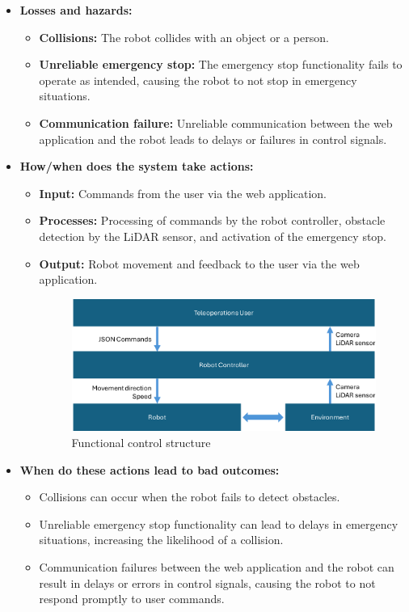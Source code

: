 \documentclass{article}
\begin{document}
\begin{itemize}[leftmargin=*]
    \item \textbf{Losses and hazards:}
    \begin{itemize}[label=--]
        \item \textbf{Collisions:} The robot collides with an object or a person.
        \item \textbf{Unreliable emergency stop:} The emergency stop functionality fails to operate as intended, causing the robot to not stop in emergency situations.
        \item \textbf{Communication failure:} Unreliable communication between the web application and the robot leads to delays or failures in control signals.
    \end{itemize}
    
    \item \textbf{How/when does the system take actions:}
    \begin{itemize}[label=--]
        \item \textbf{Input:} Commands from the user via the web application.
        \item \textbf{Processes:} Processing of commands by the robot controller, obstacle detection by the LiDAR sensor, and activation of the emergency stop.
        \item \textbf{Output:} Robot movement and feedback to the user via the web application.
        \begin{figure}[h]
            \centering
            \includegraphics[width=1\linewidth]{Functional_Control_Structure.png}
            \caption{Functional control structure}
            \label{fig:enter-label}
        \end{figure}
    \end{itemize}
    
    \item \textbf{When do these actions lead to bad outcomes:}
    \begin{itemize}[label=--]
        \item Collisions can occur when the robot fails to detect obstacles.
        \item Unreliable emergency stop functionality can lead to delays in emergency situations, increasing the likelihood of a collision.
        \item Communication failures between the web application and the robot can result in delays or errors in control signals, causing the robot to not respond promptly to user commands.
    \end{itemize}
    

\end{itemize}
\end{document}
